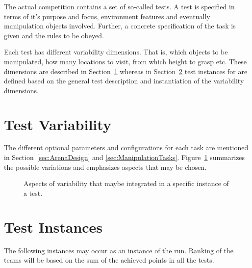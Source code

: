 
The actual competition contains a set of so-called tests. 
A test is specified in terms of it's purpose and focus, environment features and eventually manipulation objects involved. Further, a concrete specification of the task is given and the rules to be obeyed. 

Each test has different variability dimensions. That is, which objects to be manipulated, how many locations to visit, from which height to grasp etc. These dimensions are described in Section~\ref{sec:TestVariability} whereas in Section~\ref{sec:TestInstances} test instances for \YEAR are defined based on the general test description and instantiation of the variability dimensions. 












\newpage
\section{Test Variability} \label{sec:TestVariability}

The different optional parameters and configurations for each task are 
mentioned in Section~\ref{sec:ArenaDesign} and \ref{sec:ManipulationTasks}. 
Figure~\ref{fig:complexityTree} summarizes the possible variations and 
emphasizes aspects that may be chosen.

\begin{figure}[ht]
\centering

\caption{Aspects of variability that maybe integrated in a specific instance of a test.}
\label{fig:complexityTree}
\end{figure}


\section{Test Instances \YEAR} \label{sec:TestInstances}
The following instances may occur as an instance of the run. Ranking of the teams will be based on the sum of the achieved points in all the tests.


